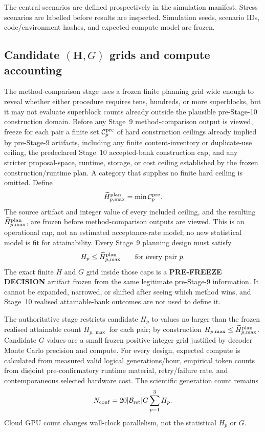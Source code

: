 \documentclass[11pt,a4paper]{article}
\newcommand{\PFD}{\textbf{PRE-FREEZE DECISION}}
\newcommand{\Bret}{\mathcal B_{\mathrm{ret}}}
\begin{document}
The central scenarios are defined prospectively in the simulation manifest. Stress scenarios are labelled before results are inspected. Simulation seeds, scenario IDs, code/environment hashes, and expected-compute model are frozen.

\subsection{Candidate $(\mathbf H,G)$ grids and compute accounting}\label{sec:hplanning}
The method-comparison stage uses a frozen finite planning grid wide enough to reveal whether either procedure requires tens, hundreds, or more superblocks, but it may not evaluate superblock counts already outside the plausible pre-Stage-10 construction domain. Before any Stage~9 method-comparison output is viewed, freeze for each pair a finite set $\mathcal C_p^{\rm pre}$ of hard construction ceilings already implied by pre-Stage-9 artifacts, including any finite content-inventory or duplicate-use ceiling, the predeclared Stage~10 accepted-bank construction cap, and any stricter proposal-space, runtime, storage, or cost ceiling established by the frozen construction/runtime plan. A category that supplies no finite hard ceiling is omitted. Define
\[
\widetilde H_{p,\max}^{\rm plan}
=
\min\mathcal C_p^{\rm pre}.
\]
The source artifact and integer value of every included ceiling, and the resulting $\widetilde H_{p,\max}^{\rm plan}$, are frozen before method-comparison outputs are viewed. This is an operational cap, not an estimated acceptance-rate model; no new statistical model is fit for attainability. Every Stage~9 planning design must satisfy
\[
H_p\le \widetilde H_{p,\max}^{\rm plan}
\qquad\text{for every pair }p.
\]
The exact finite $H$ and $G$ grid inside those caps is a \PFD{} artifact frozen from the same legitimate pre-Stage-9 information. It cannot be expanded, narrowed, or shifted after seeing which method wins, and Stage~10 realised attainable-bank outcomes are not used to define it.

The authoritative stage restricts candidate $H_p$ to values no larger than the frozen realised attainable count $H_{p,\max}$ for each pair; by construction $H_{p,\max}\le\widetilde H_{p,\max}^{\rm plan}$. Candidate $G$ values are a small frozen positive-integer grid justified by decoder Monte Carlo precision and compute. For every design, expected compute is calculated from measured valid logical generations/hour, empirical token counts from disjoint pre-confirmatory runtime material, retry/failure rate, and contemporaneous selected hardware cost. The scientific generation count remains
\[
N_{\rm conf}=20|\Bret|G\sum_{p=1}^{3}H_p.
\]
Cloud GPU count changes wall-clock parallelism, not the statistical $H_p$ or $G$.
\end{document}
